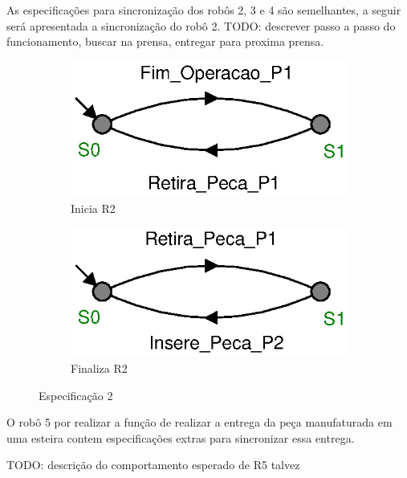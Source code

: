 As especificações para sincronização dos robôs 2, 3 e 4 são semelhantes, a seguir será apresentada a sincronização do robô 2.
TODO: descrever passo a passo do funcionamento, buscar na prensa, entregar para proxima prensa.
\begin{figure}[H]%
  \centering
  \begin{subfigure}[b]{0.45\textwidth}
      \centering
      \includegraphics[width=\textwidth]{imagens/E2_inicia_R2.eps}
      \caption{Inicia R2}
      \label{fig:e2a}
  \end{subfigure}
  \hfill
  \begin{subfigure}[b]{0.45\textwidth}
      \centering
      \includegraphics[width=\textwidth]{imagens/E2_Finaliza_R2.eps}
      \caption{Finaliza R2}
      \label{fig:e2b}
  \end{subfigure}
  \caption{Especificação 2}
  \label{fig:e2}
\end{figure}

O robô 5 por realizar a função de realizar a entrega da peça manufaturada em uma esteira contem especificações extras para sincronizar essa entrega.

TODO: descrição do comportamento esperado de R5 talvez

